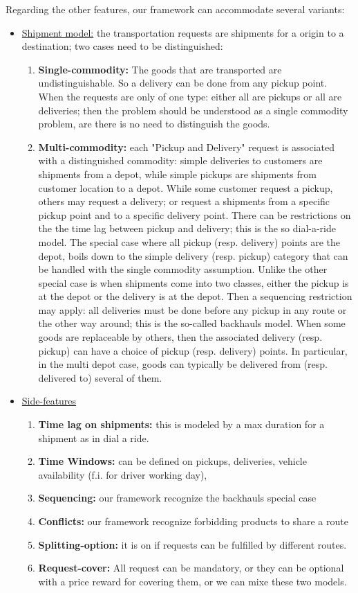 \documentclass[12pt,a4paper]{article}
\begin{document}
\noindent Regarding the other features, our framework can accommodate several variants:
\begin{itemize}
\item \underline{Shipment model:} the transportation requests are  shipments for a origin to a destination; two cases need to be distinguished:
\begin{enumerate}

\item {\bf Single-commodity:} The goods that are transported are undistinguishable. So a delivery can be done from any pickup point.  When the requests are only of one type: either all are pickups or all are deliveries; then the problem should be understood as a single commodity problem, are there is no need to distinguish the goods.

\item {\bf Multi-commodity:} each "Pickup and Delivery" request is associated with a distinguished commodity: simple deliveries to customers are shipments from a depot, while simple  pickups are shipments  from customer location  to a  depot. While some customer request a pickup, others may request a delivery; or  request a shipments from a specific pickup point and to a specific delivery point. There can be restrictions on the the time lag between pickup and delivery; this is the so dial-a-ride model. The special case where all pickup (resp. delivery) points are the depot, boils down to the simple delivery (resp. pickup) category that can be handled with the single commodity assumption. Unlike the other special case is when shipments come into two classes, either the pickup is at the depot or the delivery is at the depot. Then a  sequencing restriction may apply: all deliveries must be done before any pickup in any route or the other way around; this is the so-called backhauls model. When some goods are replaceable by others, then the associated delivery (resp. pickup) can have a choice of pickup (resp. delivery) points. In particular, in the multi depot case, goods can typically be delivered from (resp. delivered to) several of them.

\end{enumerate}
\item \underline{Side-features}
\begin{enumerate}
\item {\bf Time lag on shipments:}  this is modeled by a max duration for a  shipment as in dial a ride.
\item {\bf Time Windows:}  can be defined on pickups, deliveries, vehicle availability (f.i. for  driver working day), 
\item {\bf Sequencing:}  our framework recognize the  backhauls special case
\item {\bf  Conflicts:}   our framework recognize forbidding products to share a route
\item {\bf  Splitting-option:} it is on if requests can be fulfilled by different routes.
\item {\bf  Request-cover:} All request can be mandatory, or they can be optional with a price reward for covering them, or we can mixe these two models.
\end{enumerate}

\end{itemize}
\end{document}
